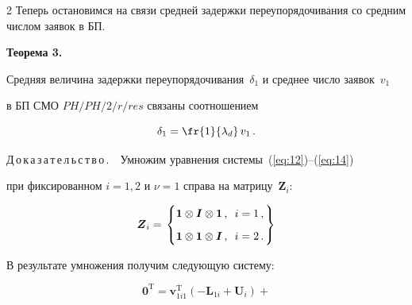 \begin{multicols}{2}
Теперь остановимся на связи средней задержки переупорядочивания со средним числом заявок в БП.



\bigskip



\noindent

{\bf{Теорема 3.}} {\it{Средняя величина задержки переупорядочивания~$\delta_1$ и среднее число заявок~$v_1$ 

в БП СМО $PH/PH/2/r/res$ связаны соотношением

\begin{equation}

\label{eq:22}

\delta_1=\fr{1}{\lambda_d}\,v_1\,.

\end{equation}

}}



\medskip



\noindent

Д\,о\,к\,а\,з\,а\,т\,е\,л\,ь\,с\,т\,в\,о\,.\ \ Умножим уравнения системы~(\ref{eq:12})--(\ref{eq:14}) 

при фиксированном $i=1,2$ и $\nu=1$ справа на матрицу~$\boldsymbol{Z}_i$:

\begin{equation*}

\boldsymbol{Z}_i=

\left.

\begin{cases}

\boldsymbol{1}\otimes \boldsymbol{I}\otimes \boldsymbol{1}\,,\enskip i=1\,,\\[6pt]

 \boldsymbol{1}\otimes \boldsymbol{1}\otimes \boldsymbol{I}\,,\enskip i=2\,.

\end{cases}\!\!\!\!\!\!

\right \}

\end{equation*}



В результате умножения получим следующую систему:

\begin{equation}

\label{eq:23}

\boldsymbol{0}^{\mathrm{T}}=\boldsymbol{v}_{1i1}^{\mathrm{T}}(-\boldsymbol{L}_{1i}+\boldsymbol{U}_i)+


\end{equation}
\end{multicols}
